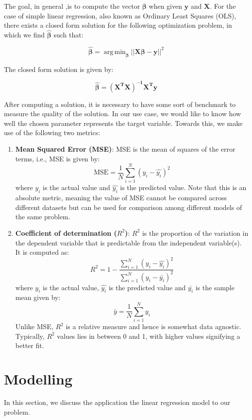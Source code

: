 \documentclass[conference]{IEEEtran}
\DeclareMathOperator*{\argmin}{arg\,min}
\begin{document}
The goal, in general ,is to compute the vector $\boldsymbol{\beta}$ when given $\mathbf{y}$ and $\mathbf{X}$. For the case of simple linear regression, also known as Ordinary Least Squares (OLS), there exists a closed form solution for the following optimization problem, in which we find $\hat{\boldsymbol{\beta}}$ such that:

$$ \hat{\boldsymbol{\beta}} = \argmin_{\boldsymbol{\beta}}{ || \mathbf{X \boldsymbol{\beta} - y} ||^2 }$$

The closed form solution is given by:

$$ \hat{\boldsymbol{\beta}} = \mathbf{(X^TX)^{-1}X^Ty} $$

After computing a solution, it is necessary to have some sort of benchmark to measure the quality of the solution. In our use case, we would like to know how well the chosen parameter represents the target variable. Towards this, we make use of the following two metrics:
\begin{enumerate}
    \item \textbf{Mean Squared Error (MSE)}: MSE is the mean of squares of the error terms, i.e., MSE is given by:
    $$ \textrm{MSE} = \frac{1}{N}\sum_{i=1}^{N}(y_i-\hat{y_i})^2 $$ where $y_i$ is the actual value and $\hat{y_i}$ is the predicted value. Note that this is an absolute metric, meaning the value of MSE cannot be compared across different datasets but can be used for comparison among different models of the same problem.
    \item \textbf{Coefficient of determination ($R^2$)}: $R^2$ is the proportion of the variation in the dependent variable that is predictable from the independent variable(s). It is computed as:
    $$ R^2 = 1 - \frac{\sum_{i = 1}^N(y_i-\hat{y_i})^2}{\sum_{i = 1}^N(y_i-\bar{y_i})^2} $$ where $y_i$ is the actual value, $\hat{y_i}$ is the predicted value and $\bar{y_i}$ is the sample mean given by:
    $$ \bar{y} = \frac{1}{N}\sum_{i = 1}^{N}y_i $$ Unlike MSE, $R^2$ is a relative measure and hence is somewhat data agnostic. Typically, $R^2$ values lies in between 0 and 1, with higher values signifying a better fit.
\end{enumerate}



\section{Modelling }

In this section, we discuss the application the linear regression model to our problem. 
\end{document}
